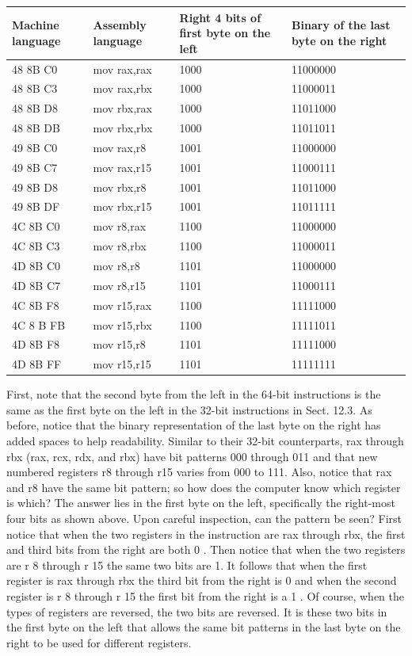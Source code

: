 \documentclass[10pt]{book}
\begin{document}
\begin{center}
\begin{tabular}{|l|l|l|l|}
\hline
Machine language & Assembly language & Right 4 bits of first byte on the left & Binary of the last byte on the right \\

\hline
48 8B C0 & mov rax,rax & 1000 & 11000000 \\
\hline
48 8B C3 & mov rax,rbx & 1000 & 11000011 \\
\hline
48 8B D8 & mov rbx,rax & 1000 & 11011000 \\
\hline
48 8B DB & mov rbx,rbx & 1000 & 11011011 \\
\hline
49 8B C0 & mov rax,r8 & 1001 & 11000000 \\
\hline
49 8B C7 & mov rax,r15 & 1001 & 11000111 \\
\hline
49 8B D8 & mov rbx,r8 & 1001 & 11011000 \\
\hline
49 8B DF & mov rbx,r15 & 1001 & 11011111 \\
\hline
4C 8B C0 & mov r8,rax & 1100 & 11000000 \\
\hline
4C 8B C3 & mov r8,rbx & 1100 & 11000011 \\
\hline
4D 8B C0 & mov r8,r8 & 1101 & 11000000 \\
\hline
4D 8B C7 & mov r8,r15 & 1101 & 11000111 \\
\hline
4C 8B F8 & mov r15,rax & 1100 & 11111000 \\
\hline
4C 8 B FB & mov r15,rbx & 1100 & 11111011 \\
\hline
4D 8B F8 & mov r15,r8 & 1101 & 11111000 \\
\hline
4D 8B FF & mov r15,r15 & 1101 & 11111111 \\
\hline
\end{tabular}
\end{center}

First, note that the second byte from the left in the 64-bit instructions is the same as the first byte on the left in the 32-bit instructions in Sect. 12.3. As before, notice that the binary representation of the last byte on the right has added spaces to help readability. Similar to their 32-bit counterparts, rax through rbx (rax, rcx, rdx, and rbx) have bit patterns 000 through 011 and that new numbered registers r8 through r15 varies from 000 to 111. Also, notice that rax and r8 have the same bit pattern; so how does the computer know which register is which? The answer lies in the first byte on the left, specifically the right-most four bits as shown above. Upon careful inspection, can the pattern be seen? First notice that when the two registers in the instruction are rax through rbx, the first and third bits from the right are both 0 . Then notice that when the two registers are r 8 through r 15 the same two bits are 1. It follows that when the first register is rax through rbx the third bit from the right is 0 and when the second register is r 8 through r 15 the first bit from the right is a 1 . Of course, when the types of registers are reversed, the two bits are reversed. It is these two bits in the first byte on the left that allows the same bit patterns in the last byte on the right to be used for different registers.
\end{document}
